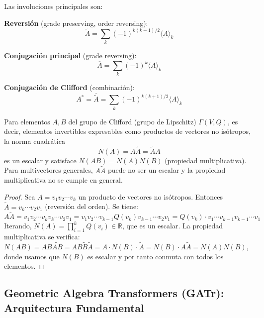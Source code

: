 \begin{definition}\label{def:involuciones_clifford}
Las involuciones principales son:

\textbf{Reversión} (grade preserving, order reversing):
\begin{equation}
    \widetilde{A} = \sum_k (-1)^{k(k-1)/2} \langle A \rangle_k
\end{equation}

\textbf{Conjugación principal} (grade reversing):
\begin{equation}
    \overline{A} = \sum_k (-1)^k \langle A \rangle_k
\end{equation}

\textbf{Conjugación de Clifford} (combinación):
\begin{equation}
    A^* = \overline{\widetilde{A}} = \sum_k (-1)^{k(k+1)/2} \langle A \rangle_k
\end{equation}
\end{definition}

\begin{proposition}\label{prop:norma_clifford}
Para elementos $A, B$ del grupo de Clifford (grupo de Lipschitz) $\Gamma(V,Q)$, es decir, elementos invertibles expresables como productos de vectores no isótropos, la norma cuadrática
\begin{equation}
    N(A) = A \widetilde{A} = \widetilde{A} A
\end{equation}
es un escalar y satisface $N(AB) = N(A)N(B)$ (propiedad multiplicativa). Para multivectores generales, $A\widetilde{A}$ puede no ser un escalar y la propiedad multiplicativa no se cumple en general.
\end{proposition}

\begin{proof}
Sea $A = v_1 v_2 \cdots v_k$ un producto de vectores no isótropos. Entonces $\widetilde{A} = v_k \cdots v_2 v_1$ (reversión del orden). Se tiene:
\[
A\widetilde{A} = v_1 v_2 \cdots v_k v_k \cdots v_2 v_1 = v_1 v_2 \cdots v_{k-1} Q(v_k) v_{k-1} \cdots v_2 v_1 = Q(v_k) \cdot v_1 \cdots v_{k-1} v_{k-1} \cdots v_1
\]
Iterando, $N(A) = \prod_{i=1}^k Q(v_i) \in \mathbb{R}$, que es un escalar. La propiedad multiplicativa se verifica: $N(AB) = AB\widetilde{AB} = AB\widetilde{B}\widetilde{A} = A \cdot N(B) \cdot \widetilde{A} = N(B) \cdot A\widetilde{A} = N(A)N(B)$, donde usamos que $N(B)$ es escalar y por tanto conmuta con todos los elementos.
\end{proof}

\subsection{Geometric Algebra Transformers (GATr): Arquitectura Fundamental}

